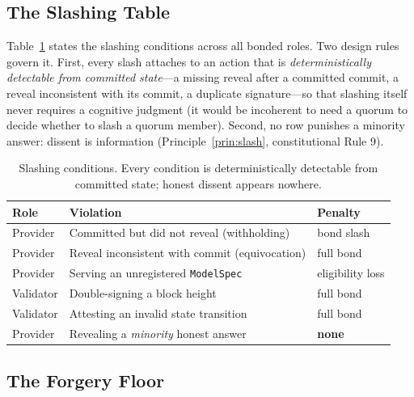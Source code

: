 \subsection{The Slashing Table}

Table~\ref{tab:slash} states the slashing conditions across all bonded roles. Two design rules govern it. First, every slash attaches to an action that is \emph{deterministically detectable from committed state}---a missing reveal after a committed commit, a reveal inconsistent with its commit, a duplicate signature---so that slashing itself never requires a cognitive judgment (it would be incoherent to need a quorum to decide whether to slash a quorum member). Second, no row punishes a minority answer: dissent is information (Principle~\ref{prin:slash}, constitutional Rule 9).

\begin{table}[h]
\centering
\caption{Slashing conditions. Every condition is deterministically detectable from committed state; honest dissent appears nowhere.}
\label{tab:slash}
\small
\begin{tabular}{@{}lll@{}}
\toprule
Role & Violation & Penalty \\
\midrule
Provider & Committed but did not reveal (withholding) & bond slash \\
Provider & Reveal inconsistent with commit (equivocation) & full bond \\
Provider & Serving an unregistered \texttt{ModelSpec} & eligibility loss \\
Validator & Double-signing a block height & full bond \\
Validator & Attesting an invalid state transition & full bond \\
\midrule
Provider & Revealing a \emph{minority} honest answer & \textbf{none} \\
\bottomrule
\end{tabular}
\end{table}

\subsection{The Forgery Floor}

